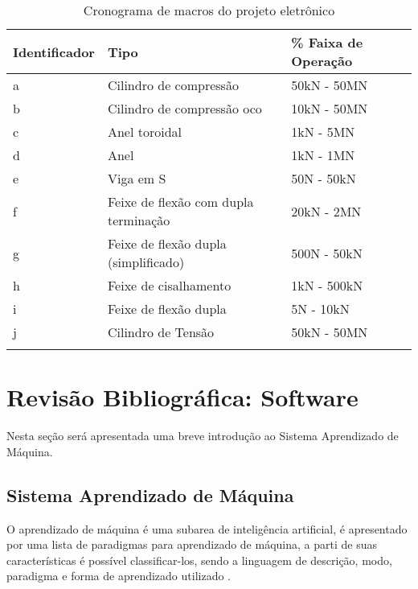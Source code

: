 			\newpage
			\begin{table}[!h]
			\centering
			\caption{Cronograma de macros do projeto eletrônico}
			\begin{tabular}{ l l l }
			\hline
			\textbf{Identificador}	&	\textbf{Tipo} &	\textbf{\% Faixa de Operação}\\
			\hline
			a & Cilindro de compressão & 50kN - 50MN\\
			\hline
			b & Cilindro de compressão oco & 10kN - 50MN\\
			\hline
			c & Anel toroidal & 1kN - 5MN\\
			\hline
			d & Anel & 1kN - 1MN\\
			\hline
			e & Viga em S & 50N - 50kN\\
			\hline
			f & Feixe de flexão com dupla terminação & 20kN - 2MN\\
			\hline
			g & Feixe de flexão dupla (simplificado) & 500N - 50kN\\
			\hline
			h & Feixe de cisalhamento & 1kN - 500kN\\
			\hline
			i & Feixe de flexão dupla & 5N - 10kN\\
			\hline
			j & Cilindro de Tensão & 50kN - 50MN\\
			\hline
			\label{tiposceluladecarga}
			\end{tabular}
			\end{table}


\newpage
\section{Revisão Bibliográfica: Software}

	Nesta seção será apresentada uma breve introdução ao Sistema Aprendizado de Máquina.

	\subsection{Sistema Aprendizado de Máquina}
			 
		O aprendizado de máquina é uma subarea de inteligência artificial, é apresentado por \cite{rezende_sistemas_2003} uma lista de paradigmas para aprendizado de máquina, a parti de suas características é possível classificar-los, sendo a linguagem de descrição, modo, paradigma e forma de aprendizado utilizado \cite{rezende_sistemas_2003}.

